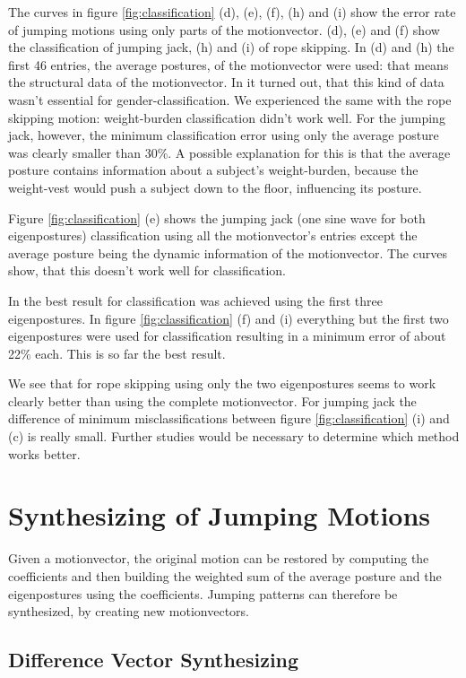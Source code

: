 \documentclass[a4paper]{article}
\begin{document}
The curves in figure \ref{fig:classification} (d), (e), (f), (h) and (i) show the error rate of jumping motions using only parts of the motionvector. (d), (e) and (f) show the classification of jumping jack, (h) and (i) of rope skipping.
In (d) and (h) the first 46 entries, the average postures, of the motionvector were used: that means the structural data of the motionvector.
In \cite{origin} it turned out, that this kind of data wasn't essential for gender-classification.
We experienced the same with the rope skipping motion: weight-burden classification didn't work well.
For the jumping jack, however, the minimum classification error using only the average posture was clearly smaller than 30\%.
A possible explanation for this is that the average posture contains information about a subject's weight-burden, because the weight-vest would push a subject down to the floor, influencing its posture.

Figure \ref{fig:classification} (e) shows the jumping jack (one sine wave for both eigenpostures) classification using all the motionvector's entries except the average posture being the dynamic information of the motionvector.
The curves show, that this doesn't work well for classification.

In \cite{origin} the best result for classification was achieved using the first three eigenpostures.
In figure \ref{fig:classification} (f) and (i) everything but the first two eigenpostures were used for classification resulting in a minimum error of about 22\% each.
This is so far the best result.

We see that for rope skipping using only the two eigenpostures seems to work clearly better than using the complete motionvector. For jumping jack the difference of minimum misclassifications between figure \ref{fig:classification} (i) and (c) is really small. Further studies would be necessary to determine which method works better.

\section{Synthesizing of Jumping Motions}

Given a motionvector, the original motion can be restored by computing the coefficients and then building the weighted sum of the average posture and the eigenpostures using the coefficients.
Jumping patterns can therefore be synthesized, by creating new motionvectors.

\subsection{Difference Vector Synthesizing}
\end{document}
